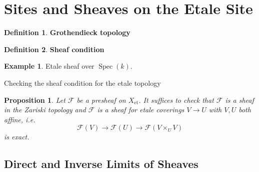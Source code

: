 \documentclass[english]{amsart}
\newcommand{\mc}{\mathcal}
\newtheorem*{prop}{Proposition}
\theoremstyle{definition}
\newtheorem*{defn}{Definition}
\newtheorem*{example}{Example}
\begin{document}
\section{Sites and Sheaves on the Etale Site}

\begin{defn}
\textbf{Grothendieck topology}
\end{defn}


\begin{defn}
\textbf{Sheaf condition}
\end{defn}


\begin{example}
Etale sheaf over $\operatorname{Spec}(k)$. 
\end{example}

Checking the sheaf condition for the etale topology

\begin{prop}
Let $\mc{F}$ be a presheaf on $X_{\text{et}}$. It suffices to check that $\mc{F}$ is a sheaf in the Zariski topology and $\mc{F}$ is a sheaf for etale coverings $V \to U$ with $V, U$ both affine, i.e. 
\[
\mc{F}(V) \to \mc{F}(U) \to \mc{F}(V \times_U V)
\]
is exact. 
\end{prop}


\subsection{Direct and Inverse Limits of Sheaves}
\end{document}
